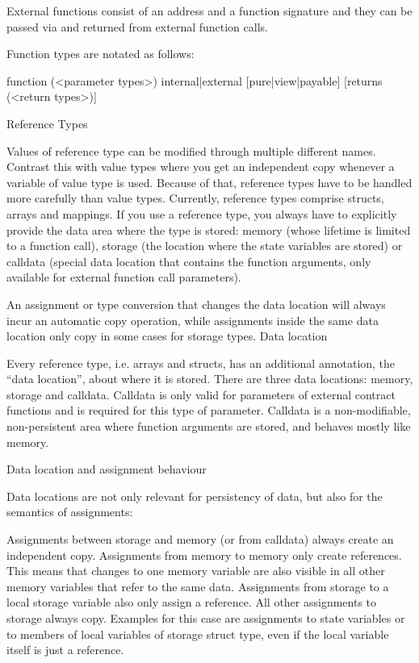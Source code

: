 \documentclass[a4paper]{article}
\begin{document}
External functions consist of an address and a function signature and they can be passed via and returned from external function calls.

Function types are notated as follows:

function (<parameter types>) {internal|external} [pure|view|payable] [returns (<return types>)]

Reference Types

Values of reference type can be modified through multiple different names. Contrast this with value types where you get an independent copy whenever a variable of value type is used. Because of that, reference types have to be handled more carefully than value types. Currently, reference types comprise structs, arrays and mappings. If you use a reference type, you always have to explicitly provide the data area where the type is stored: memory (whose lifetime is limited to a function call), storage (the location where the state variables are stored) or calldata (special data location that contains the function arguments, only available for external function call parameters).

An assignment or type conversion that changes the data location will always incur an automatic copy operation, while assignments inside the same data location only copy in some cases for storage types.
Data location

Every reference type, i.e. arrays and structs, has an additional annotation, the “data location”, about where it is stored. There are three data locations: memory, storage and calldata. Calldata is only valid for parameters of external contract functions and is required for this type of parameter. Calldata is a non-modifiable, non-persistent area where function arguments are stored, and behaves mostly like memory.

Data location and assignment behaviour

Data locations are not only relevant for persistency of data, but also for the semantics of assignments:

    Assignments between storage and memory (or from calldata) always create an independent copy.
    Assignments from memory to memory only create references. This means that changes to one memory variable are also visible in all other memory variables that refer to the same data.
    Assignments from storage to a local storage variable also only assign a reference.
    All other assignments to storage always copy. Examples for this case are assignments to state variables or to members of local variables of storage struct type, even if the local variable itself is just a reference.
\end{document}
